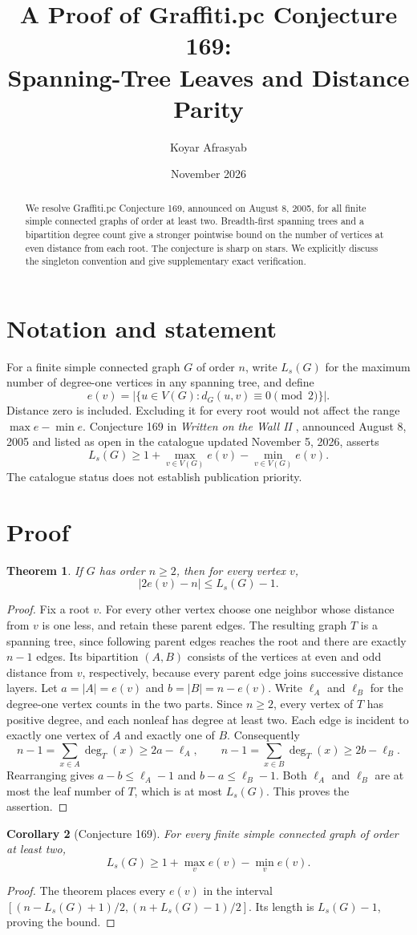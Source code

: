 \documentclass[11pt,a4paper]{article}
\title{A Proof of Graffiti.pc Conjecture 169:\\ Spanning-Tree Leaves and Distance Parity}
\author{Koyar Afrasyab}
\date{November 2026}
\newtheorem{theorem}{Theorem}
\newtheorem{corollary}[theorem]{Corollary}
\begin{document}
\maketitle
\begin{abstract}
We resolve Graffiti.pc Conjecture 169, announced on August 8, 2005, for all finite simple connected graphs of order at least two. Breadth-first spanning trees and a bipartition degree count give a stronger pointwise bound on the number of vertices at even distance from each root. The conjecture is sharp on stars. We explicitly discuss the singleton convention and give supplementary exact verification.
\end{abstract}
\section{Notation and statement}
For a finite simple connected graph $G$ of order $n$, write $L_s(G)$ for the maximum number of degree-one vertices in any spanning tree, and define
\[
 e(v)=|\{u\in V(G):d_G(u,v)\equiv 0\pmod 2\}|.
\]
Distance zero is included. Excluding it for every root would not affect the range $\max e-\min e$. Conjecture 169 in \emph{Written on the Wall II} \cite{wow}, announced August 8, 2005 and listed as open in the catalogue updated November 5, 2026, asserts
\[
 L_s(G)\ge 1+\max_{v\in V(G)}e(v)-\min_{v\in V(G)}e(v).
\]
The catalogue status does not establish publication priority.
\section{Proof}
\begin{theorem}
If $G$ has order $n\ge 2$, then for every vertex $v$,
\[
 |2e(v)-n|\le L_s(G)-1.
\]
\end{theorem}
\begin{proof}
Fix a root $v$. For every other vertex choose one neighbor whose distance from $v$ is one less, and retain these parent edges. The resulting graph $T$ is a spanning tree, since following parent edges reaches the root and there are exactly $n-1$ edges. Its bipartition $(A,B)$ consists of the vertices at even and odd distance from $v$, respectively, because every parent edge joins successive distance layers. Let $a=|A|=e(v)$ and $b=|B|=n-e(v)$. Write $\ell_A$ and $\ell_B$ for the degree-one vertex counts in the two parts.
Since $n\ge2$, every vertex of $T$ has positive degree, and each nonleaf has degree at least two. Each edge is incident to exactly one vertex of $A$ and exactly one of $B$. Consequently
\[
 n-1=\sum_{x\in A}\deg_T(x)\ge 2a-\ell_A,\qquad
 n-1=\sum_{x\in B}\deg_T(x)\ge 2b-\ell_B.
\]
Rearranging gives $a-b\le \ell_A-1$ and $b-a\le\ell_B-1$. Both $\ell_A$ and $\ell_B$ are at most the leaf number of $T$, which is at most $L_s(G)$. This proves the assertion.
\end{proof}
\begin{corollary}[Conjecture 169]
For every finite simple connected graph of order at least two,
\[
 L_s(G)\ge 1+\max_v e(v)-\min_v e(v).
\]
\end{corollary}
\begin{proof}
The theorem places every $e(v)$ in the interval
$[(n-L_s(G)+1)/2,(n+L_s(G)-1)/2]$.
Its length is $L_s(G)-1$, proving the bound.
\end{proof}
\end{document}
